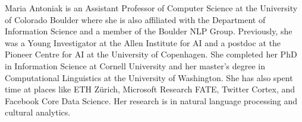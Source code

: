 Maria Antoniak is an Assistant Professor of Computer Science at the University of Colorado Boulder where she is also affiliated with the Department of Information Science and a member of the Boulder NLP Group. Previously, she was a Young Investigator at the Allen Institute for AI and a postdoc at the Pioneer Centre for AI at the University of Copenhagen. She completed her PhD in Information Science at Cornell University and her master’s degree in Computational Linguistics at the University of Washington. She has also spent time at places like ETH Zürich, Microsoft Research FATE, Twitter Cortex, and Facebook Core Data Science. Her research is in natural language processing and cultural analytics.